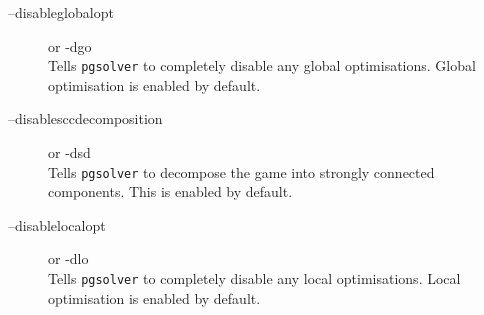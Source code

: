\begin{description}



\item[{\ttfamily --disableglobalopt}]  \enspace or {\ttfamily -dgo} \\
   Tells \texttt{pgsolver} to completely disable any global optimisations. Global optimisation is enabled by default.

% 

\item[{\ttfamily --disablesccdecomposition}]  \enspace or {\ttfamily -dsd} \\
   Tells \texttt{pgsolver} to decompose the game into strongly connected components. This is enabled by default.

\item[{\ttfamily --disablelocalopt}]  \enspace or {\ttfamily -dlo} \\
   Tells \texttt{pgsolver} to completely disable any local optimisations. Local optimisation is enabled by default.


\end{description}
